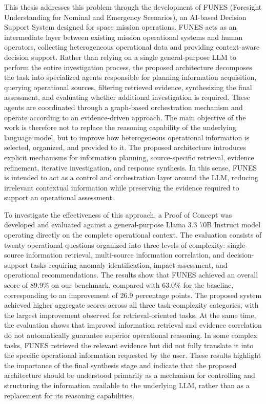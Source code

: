 This thesis addresses this problem through the development of FUNES (Foresight Understanding for Nominal and Emergency Scenarios), an AI-based Decision Support System designed for space mission operations. FUNES acts as an intermediate layer between existing mission operational systems and human operators, collecting heterogeneous operational data and providing context-aware decision support. Rather than relying on a single general-purpose LLM to perform the entire investigation process, the proposed architecture decomposes the task into specialized agents responsible for planning information acquisition, querying operational sources, filtering retrieved evidence, synthesizing the final assessment, and evaluating whether additional investigation is required. These agents are coordinated through a graph-based orchestration mechanism and operate according to an evidence-driven approach.
The main objective of the work is therefore not to replace the reasoning capability of the underlying language model, but to improve how heterogeneous operational information is selected, organized, and provided to it. The proposed architecture introduces explicit mechanisms for information planning, source-specific retrieval, evidence refinement, iterative investigation, and response synthesis. In this sense, FUNES is intended to act as a control and orchestration layer around the LLM, reducing irrelevant contextual information while preserving the evidence required to support an operational assessment.

To investigate the effectiveness of this approach, a Proof of Concept was developed and evaluated against a general-purpose Llama 3.3 70B Instruct model operating directly on the complete operational context. The evaluation consists of twenty operational questions organized into three levels of complexity: single-source information retrieval, multi-source information correlation, and decision-support tasks requiring anomaly identification, impact assessment, and operational recommendations. The results show that FUNES achieved an overall score of 89.9\% on our benchmark, compared with 63.0\% for the baseline, corresponding to an improvement of 26.9 percentage points. The proposed system achieved higher aggregate scores across all three task-complexity categories, with the largest improvement observed for retrieval-oriented tasks.
At the same time, the evaluation shows that improved information retrieval and evidence correlation do not automatically guarantee superior operational reasoning. In some complex tasks, FUNES retrieved the relevant evidence but did not fully translate it into the specific operational information requested by the user. These results highlight the importance of the final synthesis stage and indicate that the proposed architecture should be understood primarily as a mechanism for controlling and structuring the information available to the underlying LLM, rather than as a replacement for its reasoning capabilities.

